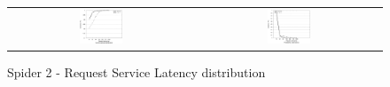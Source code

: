\begin{figure}[!t]
\centering
\begin{tabular}{cc}
{\includegraphics[width=0.24\textwidth]{./figs/spider2-reqLatCDF.eps}}&
{\includegraphics[width=0.24\textwidth]{./figs/spider2-reqLatPDF.eps}}\\
\end{tabular}
\vspace{-0.1in}
\centering
\caption{Spider 2 - Request Service Latency distribution}
\label{fig:spider1-reqLat}
\end{figure}





 
